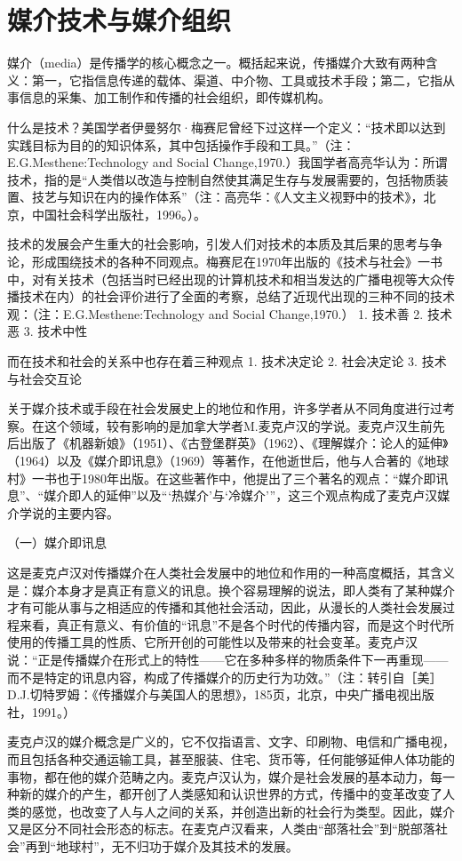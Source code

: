 \documentclass[UTF8,12pt]{ctexart}
\numberwithin{equation}{section} %
\numberwithin{figure}{section}
\numberwithin{table}{section}
\begin{document}
	\section{媒介技术与媒介组织}
	媒介（media）是传播学的核心概念之一。概括起来说，传播媒介大致有两种含义：第一，它指信息传递的载体、渠道、中介物、工具或技术手段；第二，它指从事信息的采集、加工制作和传播的社会组织，即传媒机构。
	
	什么是技术？美国学者伊曼努尔·梅赛尼曾经下过这样一个定义：“技术即以达到实践目标为目的的知识体系，其中包括操作手段和工具。”（注：E.G.Mesthene:Technology and Social Change,1970.）我国学者高亮华认为：所谓技术，指的是“人类借以改造与控制自然使其满足生存与发展需要的，包括物质装置、技艺与知识在内的操作体系”（注：高亮华：《人文主义视野中的技术》，北京，中国社会科学出版社，1996。）。
	
	技术的发展会产生重大的社会影响，引发人们对技术的本质及其后果的思考与争论，形成围绕技术的各种不同观点。梅赛尼在1970年出版的《技术与社会》一书中，对有关技术（包括当时已经出现的计算机技术和相当发达的广播电视等大众传播技术在内）的社会评价进行了全面的考察，总结了近现代出现的三种不同的技术观：（注：E.G.Mesthene:Technology and Social Change,1970.）
	1. 技术善
	2. 技术恶
	3. 技术中性
	
	而在技术和社会的关系中也存在着三种观点
	1. 技术决定论
	2. 社会决定论
	3. 技术与社会交互论
	
	
	关于媒介技术或手段在社会发展史上的地位和作用，许多学者从不同角度进行过考察。在这个领域，较有影响的是加拿大学者M.麦克卢汉的学说。麦克卢汉生前先后出版了《机器新娘》（1951）、《古登堡群英》（1962）、《理解媒介：论人的延伸》（1964）以及《媒介即讯息》（1969）等著作，在他逝世后，他与人合著的《地球村》一书也于1980年出版。在这些著作中，他提出了三个著名的观点：“媒介即讯息”、“媒介即人的延伸”以及“‘热媒介’与‘冷媒介’”，这三个观点构成了麦克卢汉媒介学说的主要内容。
	
	（一）媒介即讯息
	
	这是麦克卢汉对传播媒介在人类社会发展中的地位和作用的一种高度概括，其含义是：媒介本身才是真正有意义的讯息。换个容易理解的说法，即人类有了某种媒介才有可能从事与之相适应的传播和其他社会活动，因此，从漫长的人类社会发展过程来看，真正有意义、有价值的“讯息”不是各个时代的传播内容，而是这个时代所使用的传播工具的性质、它所开创的可能性以及带来的社会变革。麦克卢汉说：“正是传播媒介在形式上的特性——它在多种多样的物质条件下一再重现——而不是特定的讯息内容，构成了传播媒介的历史行为功效。”（注：转引自［美］D.J.切特罗姆：《传播媒介与美国人的思想》，185页，北京，中央广播电视出版社，1991。）
	
	麦克卢汉的媒介概念是广义的，它不仅指语言、文字、印刷物、电信和广播电视，而且包括各种交通运输工具，甚至服装、住宅、货币等，任何能够延伸人体功能的事物，都在他的媒介范畴之内。麦克卢汉认为，媒介是社会发展的基本动力，每一种新的媒介的产生，都开创了人类感知和认识世界的方式，传播中的变革改变了人类的感觉，也改变了人与人之间的关系，并创造出新的社会行为类型。因此，媒介又是区分不同社会形态的标志。在麦克卢汉看来，人类由“部落社会”到“脱部落社会”再到“地球村”，无不归功于媒介及其技术的发展。
	
\end{document}
